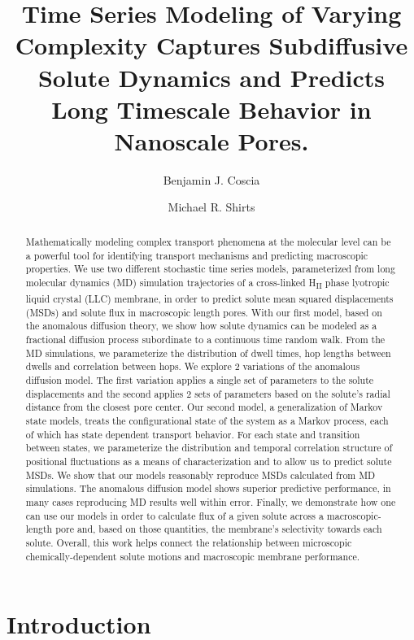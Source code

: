 \documentclass{article}
\title{Time Series Modeling of Varying Complexity Captures Subdiffusive Solute Dynamics
and Predicts Long Timescale Behavior in Nanoscale Pores.}
\author{Benjamin J. Coscia \and Michael R. Shirts}
\begin{document}
  \graphicspath{{./figures/}}
  \maketitle
  
  \begin{abstract}
  Mathematically modeling complex transport phenomena at the molecular level 
  can be a powerful tool for identifying transport mechanisms and predicting
  macroscopic properties. We use two different stochastic time series models,
  parameterized from long molecular dynamics (MD) simulation trajectories of
  a cross-linked H\textsubscript{II} phase lyotropic liquid crystal (LLC) 
  membrane, in order to predict solute mean squared displacements (MSDs) 
  and solute flux in macroscopic length pores. With our first model, based on 
  the anomalous diffusion theory, we show how solute dynamics can be modeled 
  as a fractional diffusion process subordinate to a continuous time random 
  walk. From the MD simulations, we parameterize the distribution of 
  dwell times, hop lengths between dwells and correlation between hops. We 
  explore 2 variations of the anomalous diffusion model. The first variation
  applies a single set of parameters to the solute displacements and the second
  applies 2 sets of parameters based on the solute's radial distance from the
  closest pore center. Our second model, a generalization of Markov state models,
  treats the configurational state of the system as a Markov process, each of
  which has state dependent transport behavior. For each state and transition
  between states, we parameterize the distribution and temporal correlation 
  structure of positional fluctuations as a means of characterization and to 
  allow us to predict solute MSDs. We show that our models reasonably reproduce
  MSDs calculated from MD simulations. The anomalous diffusion model shows 
  superior predictive performance, in many cases reproducing MD results well
  within error. Finally, we demonstrate how one can use our models in order to
  calculate flux of a given solute across a macroscopic-length pore and, based on 
  those quantities, the membrane's selectivity towards each solute. Overall, this
  work helps connect the relationship between microscopic chemically-dependent
  solute motions and macroscopic membrane performance.

  \end{abstract}

  \section{Introduction}
\end{document}
